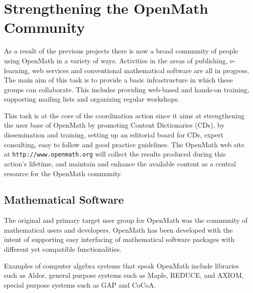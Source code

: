 \documentclass[draft]{artikel3}
\begin{document}
\section{Strengthening the OpenMath Community} 
\label{community}


As a result of the previous projects there is now a broad community of
people using OpenMath in a variety of ways.  Activities in the areas
of publishing, e-learning, web services and conventional mathematical
software are all in progress.  The main aim of this task is to provide
a basic infrastructure in which these groups can collaborate. This
includes providing web-based and hands-on training, supporting mailing
lists and organizing regular workshops.

This task is at the core of the coordination action since it aims at
strengthening the user base of OpenMath by promoting Content
Dictionaries (CDs), by dissemination and training, setting up an editorial
board for CDs, expert consulting, easy to follow and good practice
guidelines. The OpenMath web site at \texttt{http://www.openmath.org}
will collect the results produced during this action's lifetime, and
maintain and enhance the available content as a central resource for
the OpenMath community. 





\subsection{Mathematical Software}
\label{sec:msw}

The original and primary target user group for OpenMath was the
community of mathematical users and developers. OpenMath has been
developed with the intent of supporting easy interfacing of
mathematical software packages with different yet compatible
functionalities.

Examples of computer algebra systems that speak OpenMath include
libraries such as Aldor, general purpose systems such as Maple,
REDUCE, and AXIOM, special purpose systems such as GAP and CoCoA.
\end{document}
